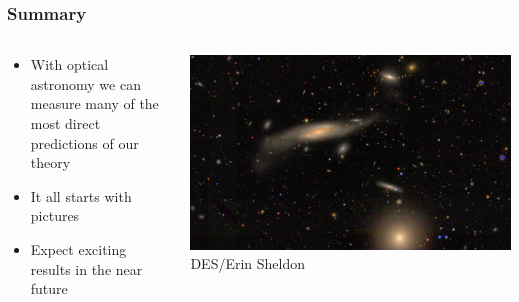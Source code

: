 \documentclass{beamer}
\begin{document}
\frame
{

    \frametitle{Summary}


    \begin{columns}
        \begin{column}{0.5\textwidth}
            \begin{itemize}

                \item With optical astronomy we can measure many of the
                    most direct predictions of our theory

                \item It all starts with pictures

                \item Expect exciting results in the near future

            \end{itemize}

        \end{column}
        \begin{column}{0.5\textwidth}
            \begin{center}
                \includegraphics[width=1.2\textwidth, angle=90]{DES0056-5248_gri_crop.jpg}
                \newline
                {\tiny DES/Erin Sheldon}
            \end{center}
        \end{column}

    \end{columns}


}
\end{document}
